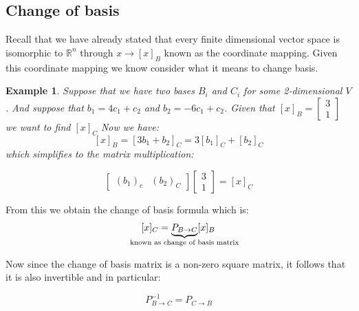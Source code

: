 \documentclass[titlepage]{article}
\newtheorem{exm}{Example}[subsection]
\numberwithin{equation}{subsection}
\newcommand{\Rn}{\mathbb{R}^n}
\begin{document}
\subsection{Change of basis}
Recall that we have already stated that every finite dimensional vector space is isomorphic to $\Rn$ through $x \to [x]_{B}$ known as the coordinate mapping. Given this coordinate mapping we know consider what it means to change basis.

\begin{exm}
Suppose that we have two bases $B_{i}$ and $C_{i}$ for some 2-dimensional $V$. And suppose that $b_{1} = 4c_{1}+c_{2}$ and $b_{2} = -6c_{1} + c_{2}$. Given that $[x]_{B} = \begin{bmatrix}
    3\\
    1
\end{bmatrix}$ we want to find $[x]_{C}$ Now we have:
$$ [x]_{B} = [3b_{1} + b_{2}]_{C} = 3[b_{1}]_{C} + [b_{2}]_{C} $$ which simplifies to the matrix multiplication:

$$ \begin{bmatrix}
    (b_{1})_{c} & (b_{2})_{C} 
\end{bmatrix}\begin{bmatrix}
    3\\
    1
\end{bmatrix} = [x]_{C}$$ 
\end{exm}

From this we obtain the change of basis formula which is:
$$ [x]_{C} = \underbrace{P_{B \to C}}_{\text{\makebox[0pt]{known as change of basis matrix}}}[x]_{B} $$

Now since the change of basis matrix is a non-zero square matrix, it follows that it is also invertible and in particular:

$$P_{B \to C}^{-1} = P_{C \to B}$$
\end{document}
